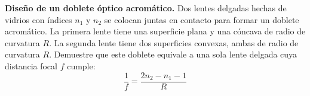 \item \textbf{Diseño de un doblete óptico acromático.}
Dos lentes delgadas hechas de vidrios con índices $n_1$ y $n_2$ se colocan juntas en contacto para formar un doblete acromático. La primera lente tiene una superficie plana y una cóncava de radio de curvatura $R$. La segunda lente tiene dos superficies convexas, ambas de radio de curvatura $R$. Demuestre que este doblete equivale a una sola lente delgada cuya distancia focal $f$ cumple:
$$ \frac{1}{f} = \frac{2n_2 - n_1 - 1}{R} $$